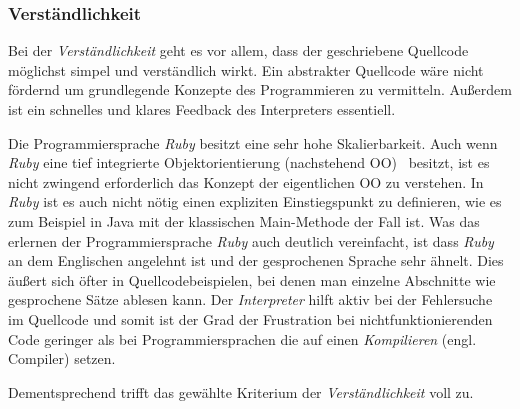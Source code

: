 \documentclass[12pt,DIV=14, version=first, BCOR=10mm,a4paper,twoside,parskip=half-,headsepline,headinclude]{scrartcl}
\begin{document}
\subsubsection{Verständlichkeit} \label{Verständlichkeit}
\begin{flushleft}
Bei der \textit{Verständlichkeit} geht es vor allem, dass der geschriebene Quellcode möglichst simpel und verständlich wirkt. Ein abstrakter Quellcode wäre nicht fördernd um grundlegende Konzepte des Programmieren zu vermitteln. Außerdem ist ein schnelles und klares Feedback des Interpreters essentiell.

Die Programmiersprache \textit{\glqq Ruby\grqq} besitzt eine sehr hohe Skalierbarkeit. Auch wenn \textit{\glqq Ruby\grqq} eine tief integrierte Objektorientierung (nachstehend \glqq OO\grqq) \, besitzt, ist es nicht zwingend erforderlich das Konzept der eigentlichen OO zu verstehen. In \textit{\glqq Ruby\grqq} ist es auch nicht nötig einen expliziten Einstiegspunkt zu definieren, wie es zum Beispiel in Java mit der klassischen Main-Methode der Fall ist. Was das erlernen der Programmiersprache \textit{\glqq Ruby\grqq} auch deutlich vereinfacht, ist dass \textit{\glqq Ruby\grqq} an dem Englischen angelehnt ist und der gesprochenen Sprache sehr ähnelt. Dies äußert sich öfter in Quellcodebeispielen, bei denen man einzelne Abschnitte wie gesprochene Sätze ablesen kann. Der \textit{Interpreter} hilft aktiv bei der Fehlersuche im Quellcode und somit ist der Grad der Frustration bei nichtfunktionierenden Code geringer als bei Programmiersprachen die auf einen \textit{Kompilieren} (engl. Compiler) setzen. 

Dementsprechend trifft das gewählte Kriterium der \textit{Verständlichkeit} voll zu.
\end{flushleft}
\end{document}

